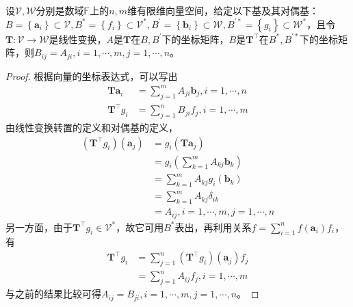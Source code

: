 \documentclass[main.tex]{subfiles}
\begin{document}
\begin{theorem}\label{thm:II.2.20}
    设$\mathcal{V},\mathcal{W}$分别是数域$\mathbb{F}$上的$n,m$维有限维向量空间，给定以下基及其对偶基：$B=\left\{\mathbf{a}_i\right\}\subset\mathcal{V},B^*=\left\{f_i\right\}\subset\mathcal{V}^*,B^\prime=\left\{\mathbf{b}_i\right\}\subset\mathcal{W},B^{\prime *}=\left\{g_i\right\}\subset\mathcal{W}^*$，且令$\mathbf{T}:\mathcal{V}\rightarrow\mathcal{W}$是线性变换，$A$是$\mathbf{T}$在$B,B^\prime$下的坐标矩阵，$B$是$\mathbf{T}^\intercal$在$B^*,B^{\prime *}$下的坐标矩阵，则$B_{ij}=A_{ji},i=1,\cdots,m,j=1,\cdots,n$。
\end{theorem}
\begin{proof}
    根据向量的坐标表达式，可以写出
    \begin{align*}
        \mathbf{Ta}_i            & =\sum_{j=1}^mA_{ji}\mathbf{b}_j,i=1,\cdots,n \\
        \mathbf{T}^\intercal g_i & =\sum_{j=1}^nB_{ji}f_j,i=1,\cdots,m
    \end{align*}
    由线性变换转置的定义和对偶基的定义，
    \begin{align*}
        \left(\mathbf{T}^\intercal g_i\right)\left(\mathbf{a}_j\right) & =g_i\left(\mathbf{Ta}_j\right)                    \\
                                                                       & =g_i\left(\sum_{k=1}^m A_{kj}\mathbf{b}_k\right)  \\
                                                                       & =\sum_{k=1}^m A_{kj} g_i\left(\mathbf{b}_k\right) \\
                                                                       & =\sum_{k=1}^mA_{kj}\delta_{ik}                    \\
                                                                       & =A_{ij},i=1,\cdots,m,j=1,\cdots,n
    \end{align*}
    另一方面，由于$\mathbf{T}^\intercal g_i\in\mathcal{V}^*$，故它可用$B^*$表出，再利用关系$f=\sum_{i=1}^nf\left(\mathbf{a}_i\right)f_i$，有
    \begin{align*}
        \mathbf{T}^\intercal g_i & =\sum_{j=1}^n\left(\mathbf{T}^\intercal g_i\right)\left(\mathbf{a}_j\right) f_j \\
                                 & =\sum_{j=1}^n A_{ij}f_j,i=1,\cdots,m
    \end{align*}
    与之前的结果比较可得$A_{ij}=B_{ji},i=1,\cdots,m,j=1,\cdots,n$。
\end{proof}
\end{document}
